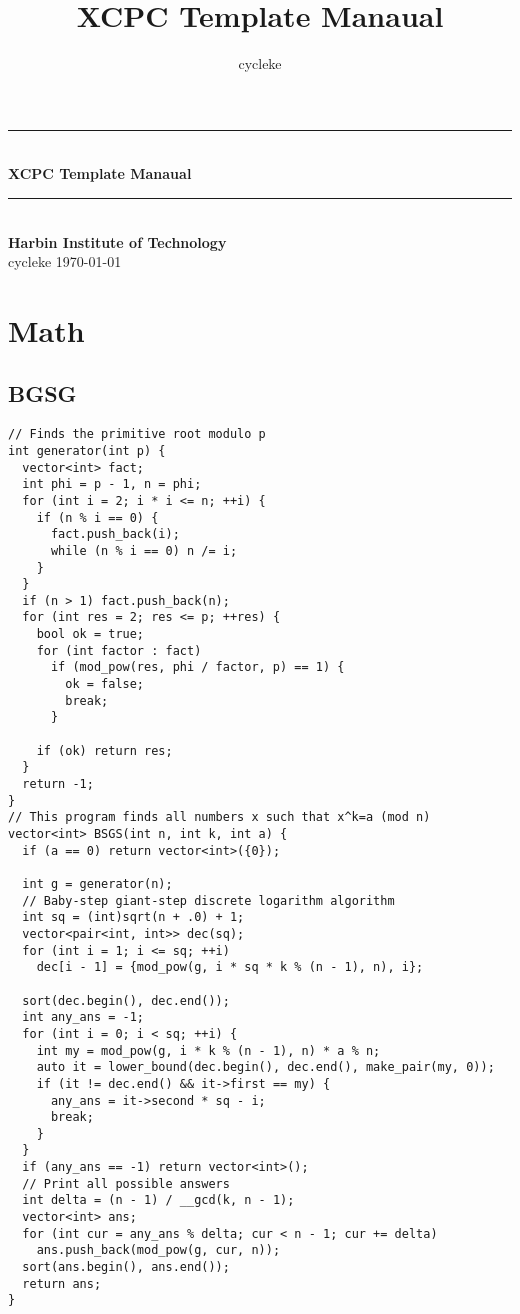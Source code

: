 \documentclass[twoside]{article}
\title{XCPC Template Manaual}
\author{cycleke}
\newcommand{\HRule}{\rule{\linewidth}{0.5mm}}
\begin{document}
\small
\begin{titlepage}
  \begin{center}
    \HRule \\ [1cm]
    \textbf{\Huge{XCPC Template Manaual}} \\ [0.5cm]
    \HRule \\ [4cm]
    \textbf{\Huge{Harbin Institute of Technology}} \\ [1cm]
    \LARGE{cycleke}
    \vfill
    \Large{\today}
  \end{center}
  \clearpage
\end{titlepage}
\tableofcontents\clearpage
\pagestyle{fancy}
\lfoot{}
\cfoot{\thepage}\rfoot{}
\setcounter{section}{0}
\setcounter{page}{1}
\clearpage

\section{Math}

\subsection{BGSG}
\begin{lstlisting}
// Finds the primitive root modulo p
int generator(int p) {
  vector<int> fact;
  int phi = p - 1, n = phi;
  for (int i = 2; i * i <= n; ++i) {
    if (n % i == 0) {
      fact.push_back(i);
      while (n % i == 0) n /= i;
    }
  }
  if (n > 1) fact.push_back(n);
  for (int res = 2; res <= p; ++res) {
    bool ok = true;
    for (int factor : fact)
      if (mod_pow(res, phi / factor, p) == 1) {
        ok = false;
        break;
      }

    if (ok) return res;
  }
  return -1;
}
// This program finds all numbers x such that x^k=a (mod n)
vector<int> BSGS(int n, int k, int a) {
  if (a == 0) return vector<int>({0});

  int g = generator(n);
  // Baby-step giant-step discrete logarithm algorithm
  int sq = (int)sqrt(n + .0) + 1;
  vector<pair<int, int>> dec(sq);
  for (int i = 1; i <= sq; ++i)
    dec[i - 1] = {mod_pow(g, i * sq * k % (n - 1), n), i};

  sort(dec.begin(), dec.end());
  int any_ans = -1;
  for (int i = 0; i < sq; ++i) {
    int my = mod_pow(g, i * k % (n - 1), n) * a % n;
    auto it = lower_bound(dec.begin(), dec.end(), make_pair(my, 0));
    if (it != dec.end() && it->first == my) {
      any_ans = it->second * sq - i;
      break;
    }
  }
  if (any_ans == -1) return vector<int>();
  // Print all possible answers
  int delta = (n - 1) / __gcd(k, n - 1);
  vector<int> ans;
  for (int cur = any_ans % delta; cur < n - 1; cur += delta)
    ans.push_back(mod_pow(g, cur, n));
  sort(ans.begin(), ans.end());
  return ans;
}

\end{lstlisting}
\end{document}
